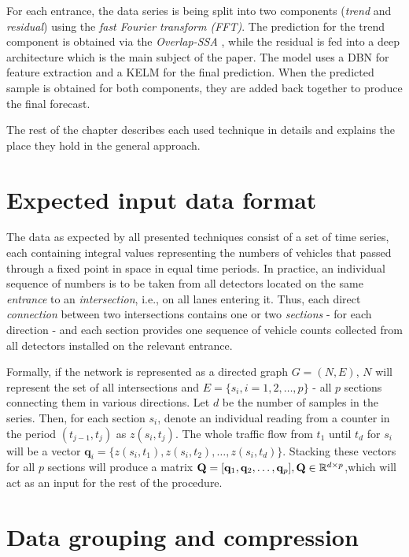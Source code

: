 For each entrance, the data series is being split into two components
(\textit{trend} and \textit{residual}) using the \textit{fast Fourier transform
(FFT)}. The prediction for the trend component is obtained via the
\textit{Overlap-SSA} \cite{Leles.2017}, while the residual is fed into a deep
architecture which is the main subject of the paper. The model uses a DBN for
feature extraction and a KELM for the final prediction. When the predicted
sample is obtained for both components, they are added back together to produce 
the final forecast.

The rest of the chapter describes each used technique in details and explains
the place they hold in the general approach.


\section{Expected input data format} \label{sec:expected-data}

The data as expected by all presented techniques consist of a set of time 
series, each containing integral values representing the numbers of vehicles 
that passed through a fixed point in space in equal time periods. In practice,
an individual sequence of numbers is to be taken from all detectors located on
the same \textit{entrance} to an \textit{intersection}, i.e., on all lanes
entering it. Thus, each direct \textit{connection} between two intersections
contains one or two \textit{sections} - for each direction - and each section
provides one sequence of vehicle counts collected from all detectors installed
on the relevant entrance.

Formally, if the network is represented as a directed graph $G=(N,E)$, $N$ will
represent the set of all intersections and $E=\{s_i,i=1,2,\ldots,p\}$ - all $p$
sections connecting them in various directions. Let $d$ be the number of samples
in the series. Then, for each section $s_i$, denote an individual reading from a
counter in the period $(t_{j-1},t_j)$ as $z(s_i,t_j)$. The whole traffic flow
from $t_1$ until $t_d$ for $s_i$ will be a vector
$\mathbf{q}_i=\{z(s_i,t_1),z(s_i,t_2),\ldots,z(s_i,t_d)\}$. Stacking these
vectors for all $p$ sections will produce a matrix
$\mathbf{Q}=[\mathbf{q}_1,\mathbf{q}_2,\ldots,\mathbf{q}_p],\space\mathbf{Q}
\in\mathbb{R}^{d\times p}$,which will act as an input for the rest of the procedure.


\section{Data grouping and compression} \label{sec:data-grouping-and-compression}

